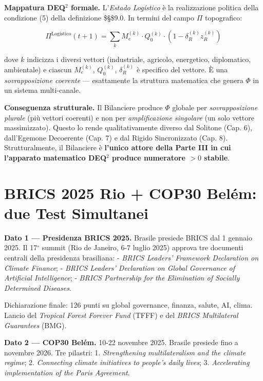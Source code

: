 \Proved{} \textbf{Mappatura DEQ$^2$ formale.} L'\emph{Estado Logístico} è
la realizzazione politica della condizione (5) della definizione
\$\S\$9.0. In termini del campo \(\Pi\) topografico:

\[\Pi^{\text{Logístico}}(t+1) = \sum_{k} M_e^{(k)} \cdot Q_0^{(k)} \cdot (1 - \delta_R^{(k)} z_R^{(k)})\]

dove \(k\) indicizza i diversi vettori (industriale, agricolo,
energetico, diplomatico, ambientale) e ciascun \(M_e^{(k)}\),
\(Q_0^{(k)}\), \(\delta_R^{(k)}\) è specifico del vettore. È una
\emph{sovrapposizione coerente} --- esattamente la struttura matematica
che genera \(\Phi\) in un sistema multi-canale.

\Hypoth{} \textbf{Conseguenza strutturale.} Il Bilanciere produce
\(\Phi\) globale per \emph{sovrapposizione plurale} (più vettori
coerenti) e non per \emph{amplificazione singolare} (un solo vettore
massimizzato). Questo lo rende qualitativamente diverso dal Solitone
(Cap. 6), dall'Egemone Decoerente (Cap. 7) e dal Rigido Sincronizzato
(Cap. 8). Strutturalmente, il Bilanciere è \textbf{l'unico attore della
Parte III in cui l'apparato matematico DEQ$^2$ produce numeratore \(> 0\)
stabile}.



\section{BRICS 2025 Rio + COP30 Belém: due Test
Simultanei}\label{brics-2025-rio-cop30-beluxe9m-due-test-simultanei}

\Proved{} \textbf{Dato 1 --- Presidenza BRICS 2025.} Brasile presiede
BRICS dal 1 gennaio 2025. Il 17$^\circ$ summit (Rio de Janeiro, 6-7 luglio
2025) approva tre documenti centrali della presidenza brasiliana: -
\emph{BRICS Leaders' Framework Declaration on Climate Finance}; -
\emph{BRICS Leaders' Declaration on Global Governance of Artificial
Intelligence}; - \emph{BRICS Partnership for the Elimination of Socially
Determined Diseases}.

Dichiarazione finale: 126 punti su global governance, finanza, salute,
AI, clima. Lancio del \emph{Tropical Forest Forever Fund} (TFFF) e del
\emph{BRICS Multilateral Guarantees} (BMG).

\Proved{} \textbf{Dato 2 --- COP30 Belém.} 10-22 novembre 2025. Brasile
presiede fino a novembre 2026. Tre pilastri: 1. \emph{Strengthening
multilateralism and the climate regime}; 2. \emph{Connecting climate
initiatives to people's daily lives}; 3. \emph{Accelerating
implementation of the Paris Agreement}.

